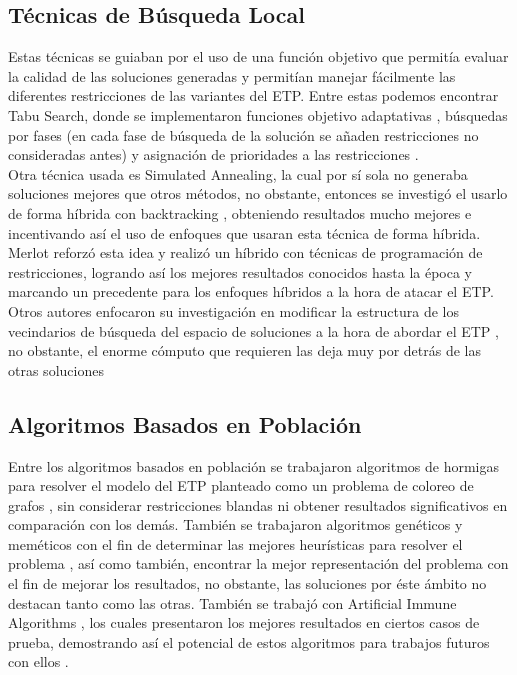 \documentclass[letter, 10pt]{article}
\begin{document}
\subsection*{Técnicas de Búsqueda Local}

Estas técnicas se guiaban por el uso de una función objetivo que permitía evaluar la calidad de las soluciones generadas y permitían manejar fácilmente las diferentes restricciones de las variantes del ETP. Entre estas podemos encontrar Tabu Search, donde se implementaron funciones objetivo adaptativas \cite{10.1007/3-540-44629-X_7}, búsquedas por fases (en cada fase de búsqueda de la solución se añaden restricciones no consideradas antes) y asignación de prioridades a las restricciones \cite{paquetehmm}.\\ 

Otra técnica usada es Simulated Annealing, la cual por sí sola no generaba soluciones mejores que otros métodos, no obstante, entonces se investigó el usarlo de forma híbrida con backtracking \cite{THOMPSON1998637}, obteniendo resultados mucho mejores e incentivando así el uso de enfoques que usaran esta técnica de forma híbrida. Merlot \cite{10.1007/978-3-540-45157-0_14} reforzó esta idea y realizó un híbrido con técnicas de programación de restricciones, logrando así los mejores resultados conocidos hasta la época y marcando un precedente para los enfoques híbridos a la hora de atacar el ETP.\\

Otros autores enfocaron su investigación en modificar la estructura de los vecindarios de búsqueda del espacio de soluciones a la hora de abordar el ETP , no obstante, el enorme cómputo que requieren las deja muy por detrás de las otras soluciones \cite{Qu2009}

\subsection*{Algoritmos Basados en Población}

Entre los algoritmos basados en población se trabajaron algoritmos de hormigas para resolver el modelo del ETP planteado como un problema de coloreo de grafos \cite{hormigasowo}, sin considerar restricciones blandas ni obtener resultados significativos en comparación con los demás. También se trabajaron algoritmos genéticos y meméticos con el fin de determinar las mejores heurísticas para resolver el problema \cite{10.1007/3-540-44629-X_9, niche, sheibani2002evolutionary}, así como también, encontrar la mejor representación del problema con el fin de mejorar los resultados, no obstante, las soluciones por éste ámbito no destacan tanto como las otras. También se trabajó con Artificial Immune Algorithms \cite{malim2006artificial}, los cuales presentaron los mejores resultados en ciertos casos de prueba, demostrando así el potencial de estos algoritmos para trabajos futuros con ellos \cite{Qu2009}.
\end{document}
